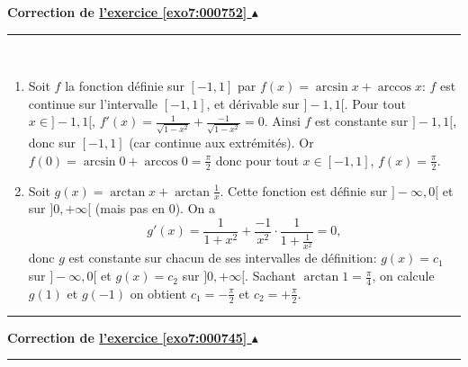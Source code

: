 \documentclass[11pt,a4paper]{article}
\newcommand{\Arcsin}{\mathop{\mathrm{arcsin}}\nolimits}
\newcommand{\Arccos}{\mathop{\mathrm{arccos}}\nolimits}
\newcommand{\Arctan}{\mathop{\mathrm{arctan}}\nolimits}
\newcounter{exo}
\newcommand{\correction}[1]{\hypertarget{cor7:#1}{}\label{cor7:#1}{\bf Correction de \hyperlink{exo7:#1}{l'exercice \ref{exo7:#1} $\blacktriangle$}}\vspace{1mm}\hrule\vspace{1mm}}
\newcommand{\fincorrection}{\vspace{1mm}\hrule\vspace*{7mm}}
\begin{document}
\correction{000752}\ 
\begin{enumerate}
    \item Soit $f$ la fonction définie sur $[-1,1]$ par 
$f(x) = \Arcsin x +\Arccos x$: $f$ est continue sur l'intervalle $[-1,1]$, 
et dérivable sur $]-1,1[$. Pour tout $x\in]-1,1[$, 
$f'(x)= \frac{1}{\sqrt{1-x^2}}+\frac{-1}{\sqrt{1-x^2}}  = 0$. 
Ainsi $f$ est constante sur $]-1,1[$, donc sur $[-1,1]$ (car continue aux extrémités). 
Or $f(0) = \Arcsin 0 +\Arccos 0 = \frac \pi 2$
donc pour tout $x\in[-1,1]$, $f(x) = \frac \pi 2$.

   \item Soit $g(x) = \Arctan x + \Arctan \frac 1x$.
Cette fonction est définie sur $]-\infty,0[$ et sur $]0,+\infty[$ (mais pas en $0$).
On a 
$$g'(x)= \frac{1}{1+x^2} + \frac{-1}{x^2} \cdot \frac{1}{1+\frac{1}{x^2}} = 0,$$
donc $g$ est constante sur chacun de ses intervalles de définition:
$g(x) = c_1$ sur $]-\infty,0[$ et $g(x) = c_2$ sur $]0,+\infty[$.
Sachant $\Arctan 1 = \frac\pi4$, on calcule $g(1)$ et $g(-1)$ on obtient $c_1 = -\frac \pi 2$
et $c_2 = +\frac \pi 2$.
\end{enumerate}
\fincorrection
\correction{000745}\ 
\end{document}
